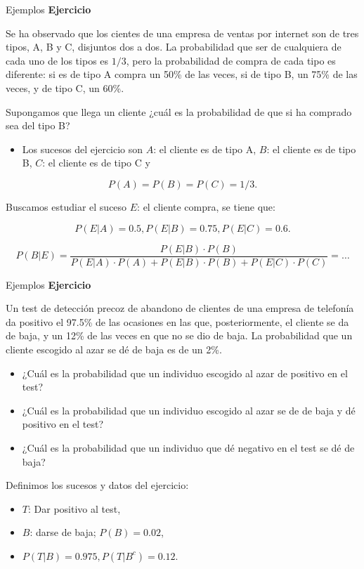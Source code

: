 \documentclass[
  ignorenonframetext,
]{beamer}
\providecommand{\tightlist}{%
  \setlength{\itemsep}{0pt}\setlength{\parskip}{0pt}}
\begin{document}
\begin{frame}{Ejemplos}
\protect\hypertarget{ejemplos-8}{}
\textbf{Ejercicio}

Se ha observado que los cientes de una empresa de ventas por internet
son de tres tipos, A, B y C, disjuntos dos a dos. La probabilidad que
ser de cualquiera de cada uno de los tipos es \(1/3\), pero la
probabilidad de compra de cada tipo es diferente: si es de tipo A compra
un 50\% de las veces, si de tipo B, un 75\% de las veces, y de tipo C,
un 60\%.

Supongamos que llega un cliente ¿cuál es la probabilidad de que si ha
comprado sea del tipo B?

\begin{itemize}
\tightlist
\item
  Los sucesos del ejercicio son \(A\): el cliente es de tipo A, \(B\):
  el cliente es de tipo B, \(C\): el cliente es de tipo C y
\end{itemize}

\[P(A)=P(B)=P(C)=1/3.\]

Buscamos estudiar el suceso \(E\): el cliente compra, se tiene que:

\[P(E|A)=0.5, P(E|B)=0.75, P(E|C)=0.6.\]

\[P(B|E)\!=\!\dfrac{P(E|B)\cdot P(B)}{P(E|A)\!\cdot\! P(A)\!+\!P(E|B)\!\cdot\! P(B)\!+\!P(E|C)\!\cdot\! P(C)}\!=\!\ldots\]
\end{frame}

\begin{frame}{Ejemplos}
\protect\hypertarget{ejemplos-9}{}
\textbf{Ejercicio}

Un test de detección precoz de abandono de clientes de una empresa de
telefonía da positivo el 97.5\% de las ocasiones en las que,
posteriormente, el cliente se da de baja, y un 12\% de las veces en que
no se dio de baja. La probabilidad que un cliente escogido al azar se dé
de baja es de un 2\%.

\begin{itemize}
\tightlist
\item
  ¿Cuál es la probabilidad que un individuo escogido al azar de positivo
  en el test?
\item
  ¿Cuál es la probabilidad que un individuo escogido al azar se de de
  baja y dé positivo en el test?
\item
  ¿Cuál es la probabilidad que un individuo que dé negativo en el test
  se dé de baja?
\end{itemize}

Definimos los sucesos y datos del ejercicio:

\begin{itemize}
\tightlist
\item
  \(T\): Dar positivo al test,
\item
  \(B\): darse de baja; \(P(B)=0.02\),
\item
  \(P(T|B)=0.975, P(T|B^c)=0.12\).
\end{itemize}
\end{frame}
\end{document}
